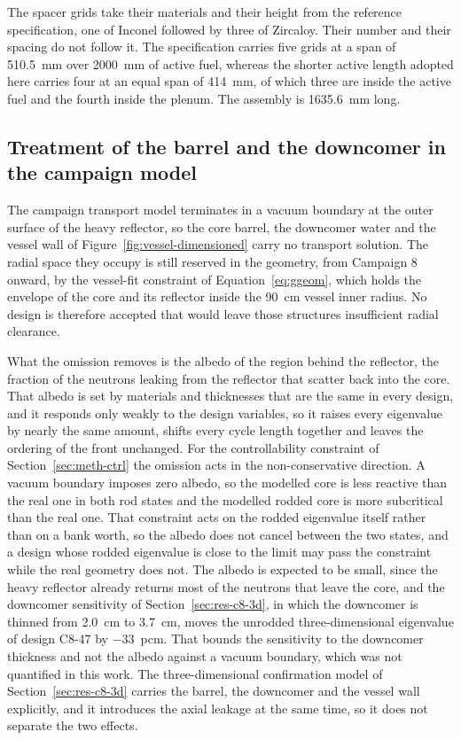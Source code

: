 The spacer grids take their materials and their height from the
reference specification, one of Inconel followed by three of Zircaloy.
Their number and their spacing do not follow it. The specification
carries five grids at a span of \SI{510.5}{mm} over \SI{2000}{mm} of
active fuel, whereas the shorter active length adopted here carries
four at an equal span of \SI{414}{mm}, of which three are inside the
active fuel and the fourth inside the plenum. The assembly is
\SI{1635.6}{mm} long.

\subsection{Treatment of the barrel and the downcomer in the campaign model}
\label{sec:meth-barrel}

The campaign transport model terminates in a vacuum boundary at the
outer surface of the heavy reflector, so the core barrel, the downcomer
water and the vessel wall of Figure~\ref{fig:vessel-dimensioned} carry
no transport solution. The radial space they occupy is still reserved
in the geometry, from Campaign 8 onward, by the vessel-fit constraint
of Equation~\eqref{eq:ggeom}, which holds the envelope of the core and
its reflector inside the \SI{90}{cm} vessel inner radius. No design is
therefore accepted that would leave those structures insufficient
radial clearance.

What the omission removes is the albedo of the region behind the
reflector, the fraction of the neutrons leaking from the reflector that
scatter back into the core. That albedo is set by materials and
thicknesses that are the same in every design, and it responds only
weakly to the design variables, so it raises every eigenvalue by nearly
the same amount, shifts every cycle length together and leaves the
ordering of the front unchanged. For the controllability constraint of
Section~\ref{sec:meth-ctrl} the omission acts in the non-conservative
direction. A vacuum boundary imposes zero albedo, so the modelled core
is less reactive than the real one in both rod states and the modelled
rodded core is more subcritical than the real one. That constraint acts on
the rodded eigenvalue itself rather than on a bank worth, so the albedo
does not cancel between the two states, and a design whose rodded
eigenvalue is close to the limit may pass the constraint while the real
geometry does not. The albedo is expected to be small, since the heavy
reflector already returns most of the neutrons that leave the core, and
the downcomer sensitivity of Section~\ref{sec:res-c8-3d}, in which the
downcomer is thinned from \SI{2.0}{cm} to \SI{3.7}{cm}, moves the
unrodded three-dimensional eigenvalue of design C8-47 by
\SI{-33}{pcm}. That bounds the sensitivity to the downcomer thickness
and not the albedo against a vacuum boundary, which was not quantified
in this work. The
three-dimensional confirmation model of Section~\ref{sec:res-c8-3d}
carries the barrel, the downcomer and the vessel wall explicitly, and
it introduces the axial leakage at the same time, so it does not
separate the two effects.


